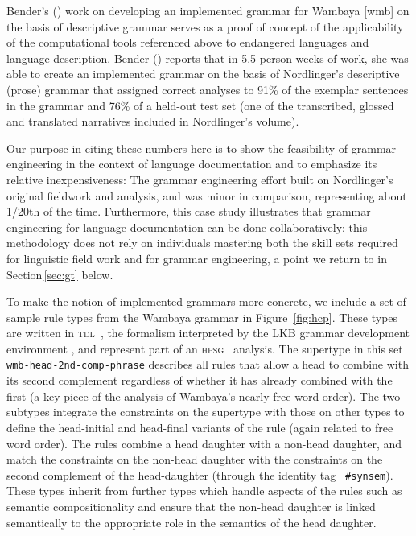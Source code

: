\documentclass[12pt]{article}
\newcommand{\sref}[1]{Section$\,$\ref{#1}}
\newcommand{\tdl}{\textsc{tdl}}
\newcommand{\hpsg}{\textsc{hpsg}\xspace}
\begin{document}
Bender's (\citeyear{Bender:08a,Bender:10}) work on developing an
implemented grammar for Wambaya [wmb] on the basis of
 descriptive grammar serves as a proof of
concept of the applicability of the computational tools referenced
above to endangered languages and language
description. Bender (\citeyear{Bender:08a}) reports that in 5.5 person-weeks of
work, she was able to create an implemented grammar on the basis of
Nordlinger's descriptive (prose) grammar that assigned correct
analyses to 91\% of the exemplar sentences in the grammar and 76\% of
a held-out test set (one of the transcribed, glossed and translated
narratives included in Nordlinger's volume).

Our purpose in citing these numbers here is to show the feasibility of
grammar engineering in the context of language documentation and to
emphasize its relative inexpensiveness: The grammar engineering effort
built on Nordlinger's original fieldwork and analysis, and was minor
in comparison, representing about 1/20th of the time.  Furthermore,
this case study illustrates that grammar engineering for language
documentation can be done collaboratively: this methodology does not
rely on individuals mastering both the skill sets required for
linguistic field work and for grammar engineering, a point we return
to in \sref{sec:gt} below.

To make the notion of implemented grammars more concrete, we include a
set of sample rule types from the Wambaya grammar in
Figure~\ref{fig:hcp}.  These types are written in
\tdl\ \cite{Copestake:00}, the formalism interpreted by the LKB
grammar development environment \cite{Copestake:02}, and represent
part of an \hpsg\ \cite{Pol:Sag:94} analysis.  The supertype in this
set {\tt wmb-head-2nd-comp-phrase} describes all rules that allow a
head to combine with its second complement regardless of whether it has already
combined with the
first (a key piece of the analysis of Wambaya's nearly free word
order).  The two subtypes integrate the constraints on the supertype
with those on other types to define the head-initial and head-final
variants of the rule (again related to free word order).  The rules
combine a head daughter with a non-head daughter, and match the
constraints on the non-head daughter with the constraints on the
second complement of the head-daughter (through the identity tag {\tt
  \#synsem}). These types inherit from further types which handle
aspects of the rules such as semantic compositionality and ensure that the
non-head daughter is linked semantically to the appropriate role
in the semantics of the head daughter.
\end{document}
